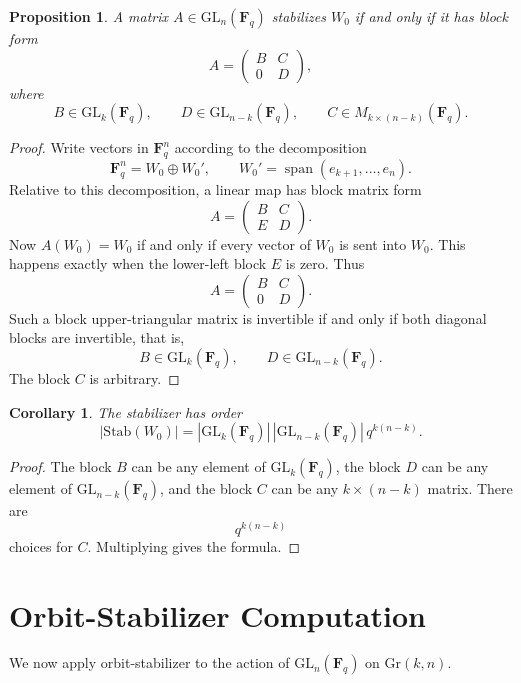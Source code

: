 \documentclass[11pt]{article}
\newtheorem{proposition}[theorem]{Proposition}
\newtheorem{corollary}[theorem]{Corollary}
\theoremstyle{definition}
\theoremstyle{remark}
\newcommand{\F}{\mathbf{F}}
\newcommand{\GL}{\mathrm{GL}}
\newcommand{\Gr}{\mathrm{Gr}}
\newcommand{\Stab}{\mathrm{Stab}}
\newcommand{\Span}{\operatorname{span}}
\begin{document}
	\begin{proposition}
		A matrix \(A\in \GL_n(\F_q)\) stabilizes \(W_0\) if and only if it has block form
		\[
		A=
		\begin{pmatrix}
			B & C\\
			0 & D
		\end{pmatrix},
		\]
		where
		\[
		B\in \GL_k(\F_q),\qquad D\in \GL_{n-k}(\F_q),\qquad C\in M_{k\times (n-k)}(\F_q).
		\]
	\end{proposition}
	
	\begin{proof}
		Write vectors in \(\F_q^n\) according to the decomposition
		\[
		\F_q^n = W_0 \oplus W_0',
		\qquad
		W_0'=\Span(e_{k+1},\dots,e_n).
		\]
		Relative to this decomposition, a linear map has block matrix form
		\[
		A=
		\begin{pmatrix}
			B & C\\
			E & D
		\end{pmatrix}.
		\]
		Now \(A(W_0)=W_0\) if and only if every vector of \(W_0\) is sent into \(W_0\). This happens exactly when the lower-left block \(E\) is zero. Thus
		\[
		A=
		\begin{pmatrix}
			B & C\\
			0 & D
		\end{pmatrix}.
		\]
		Such a block upper-triangular matrix is invertible if and only if both diagonal blocks are invertible, that is,
		\[
		B\in \GL_k(\F_q),\qquad D\in \GL_{n-k}(\F_q).
		\]
		The block \(C\) is arbitrary.
	\end{proof}
	
	\begin{corollary}
		The stabilizer has order
		\[
		|\Stab(W_0)|
		=
		|\GL_k(\F_q)|\,|\GL_{n-k}(\F_q)|\,q^{k(n-k)}.
		\]
	\end{corollary}
	
	\begin{proof}
		The block \(B\) can be any element of \(\GL_k(\F_q)\), the block \(D\) can be any element of \(\GL_{n-k}(\F_q)\), and the block \(C\) can be any \(k\times (n-k)\) matrix. There are
		\[
		q^{k(n-k)}
		\]
		choices for \(C\). Multiplying gives the formula.
	\end{proof}
	
	\section{Orbit-Stabilizer Computation}
	
	We now apply orbit-stabilizer to the action of \(\GL_n(\F_q)\) on \(\Gr(k,n)\).
	
\end{document}
